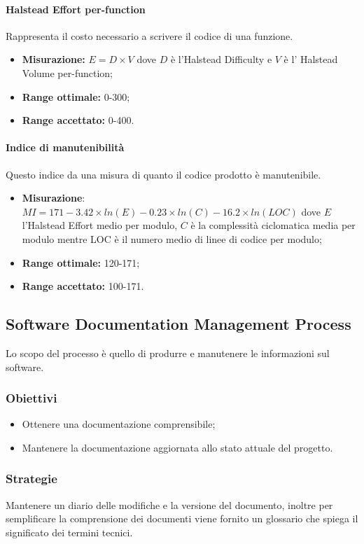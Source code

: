 			\paragraph{Halstead Effort per-function} \Spazio
			Rappresenta il costo necessario a scrivere il codice di una funzione.
			\begin{itemize}
				\item \textbf{Misurazione:} $E=D\times V$ dove $D$ è l'Halstead Difficulty e $V$ è l' Halstead Volume per-function;
				\item \textbf{Range ottimale:} 0-300;
				\item \textbf{Range accettato:} 0-400.
			\end{itemize}
			\paragraph{Indice di manutenibilità}  \Spazio
			Questo indice da una misura di quanto il codice prodotto è manutenibile.
			\begin{itemize}
				\item \textbf{Misurazione}:$MI=171-3.42\times ln(E)-0.23\times ln(C)-16.2\times ln(LOC)$ dove $E$  l'Halstead Effort medio per modulo, $C$ è la complessità ciclomatica media per modulo mentre LOC è il numero medio di linee di codice per modulo;
				\item \textbf{Range ottimale:} 120-171;
				\item \textbf{Range accettato:} 100-171.
			\end{itemize}

	\subsection{Software Documentation Management Process}
	\label{sub:qdp3}
	
	Lo scopo del processo è quello di produrre e manutenere le informazioni sul software.
		\subsubsection{Obiettivi}
		\begin{itemize}
			\item Ottenere una documentazione comprensibile;
			\item Mantenere la documentazione aggiornata allo stato attuale del progetto.
		\end{itemize}
		\subsubsection{Strategie}
		Mantenere un diario delle modifiche e la versione del documento, inoltre per semplificare la comprensione dei documenti viene fornito un glossario che spiega il significato dei termini tecnici. 
